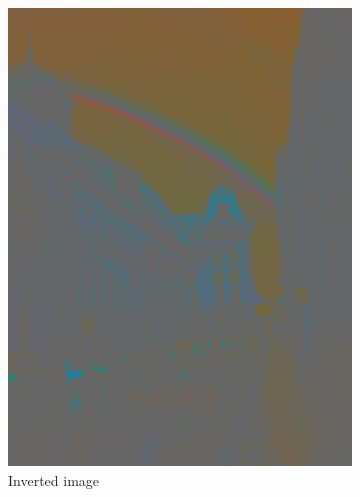 \documentclass[a4paper]{article}
\begin{document}
\begin{figure}[ht]
	\vspace{3mm}
	\begin{subfigure}[h]{0.48\textwidth}
		\centering
		\includegraphics[width=\textwidth]{rainbow_inv}
		\caption*{Inverted image}
	\end{subfigure}
	~
	\begin{subfigure}[h]{0.48\textwidth}
		\centering

\end{subfigure}
\end{figure}
\end{document}
